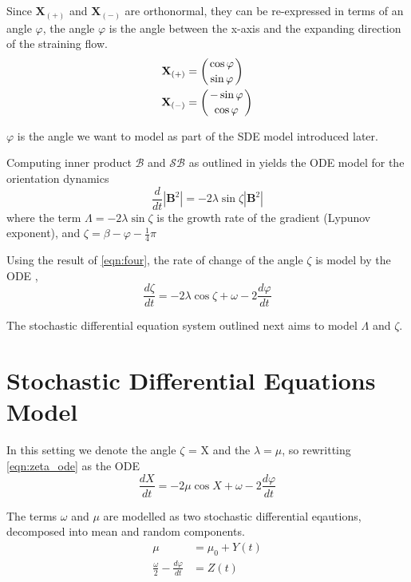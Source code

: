 Since $\mathbf{X}_{(+)}$ and $\mathbf{X}_{(-)}$ are orthonormal, they can be re-expressed in terms of an angle $\varphi$, the angle $\varphi$ is the angle between the x-axis and the expanding direction of the straining flow.
\begin{align*}
 \mathbf{X}_{(+)} &= \left(\cos \varphi \atop \sin \varphi \right)  \\
 \mathbf{X}_{(-)} &= \left(-\sin \varphi \atop \cos \varphi \right)  \\
\end{align*}

$\varphi$ is the angle we want to model as part of the SDE model introduced later.

Computing inner product $\mathcal{B}$ and $\mathcal{S}\mathcal{B}$ as outlined in \cite{stretch} yields the ODE model for the orientation dynamics
\begin{equation}
 \frac{d}{dt}|\mathbf{B}^{2}| = -2 \lambda \sin \zeta |\mathbf{B}^{2}|
\end{equation}
where the term $\Lambda = -2 \lambda \sin \zeta$ is the growth rate of the gradient (Lypunov exponent), and $\zeta = \beta - \varphi -\frac{1}{4}\pi$

Using the result of \ref{eqn:four}, the rate of change of the angle $\zeta$ is model by the ODE , 
\begin{equation}
  \label{eqn:zeta_ode}
 \frac{d \zeta}{dt} = -2 \lambda \cos \zeta + \omega - 2 \frac{d \varphi}{dt}
\end{equation}

The stochastic differential equation system outlined next aims to model $\Lambda$ and $\zeta$.

\section{Stochastic Differential Equations Model}
In this setting we denote the angle $\zeta$ = X and the $\lambda = \mu$, so rewritting \ref{eqn:zeta_ode} as the ODE
\begin{equation}
  \label{eqn:x_sde}
 \frac{d X}{dt} = -2 \mu \cos X + \omega - 2 \frac{d \varphi}{dt}
\end{equation}

The terms $\omega$ and $\mu$ are modelled as two stochastic differential eqautions, decomposed into mean and random components. 
\begin{align*}
\mu &= \mu_{0} + Y(t) \\
\frac{\omega}{2} -  \frac{d \varphi}{dt} &= Z(t) 
\end{align*}

